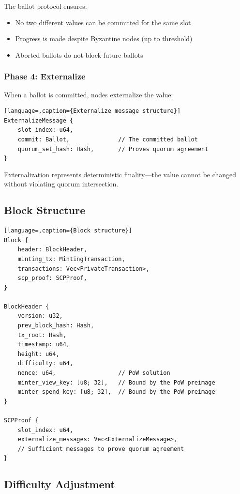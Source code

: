 The ballot protocol ensures:
\begin{itemize}
  \item No two different values can be committed for the same slot
  \item Progress is made despite Byzantine nodes (up to threshold)
  \item Aborted ballots do not block future ballots
\end{itemize}

\subsubsection{Phase 4: Externalize}

When a ballot is committed, nodes externalize the value:

\begin{lstlisting}[language=,caption={Externalize message structure}]
ExternalizeMessage {
    slot_index: u64,
    commit: Ballot,              // The committed ballot
    quorum_set_hash: Hash,       // Proves quorum agreement
}
\end{lstlisting}

Externalization represents deterministic finality---the value cannot be
changed without violating quorum intersection.

\subsection{Block Structure}

\begin{lstlisting}[language=,caption={Block structure}]
Block {
    header: BlockHeader,
    minting_tx: MintingTransaction,
    transactions: Vec<PrivateTransaction>,
    scp_proof: SCPProof,
}

BlockHeader {
    version: u32,
    prev_block_hash: Hash,
    tx_root: Hash,
    timestamp: u64,
    height: u64,
    difficulty: u64,
    nonce: u64,                  // PoW solution
    minter_view_key: [u8; 32],   // Bound by the PoW preimage
    minter_spend_key: [u8; 32],  // Bound by the PoW preimage
}

SCPProof {
    slot_index: u64,
    externalize_messages: Vec<ExternalizeMessage>,
    // Sufficient messages to prove quorum agreement
}
\end{lstlisting}

\subsection{Difficulty Adjustment}

